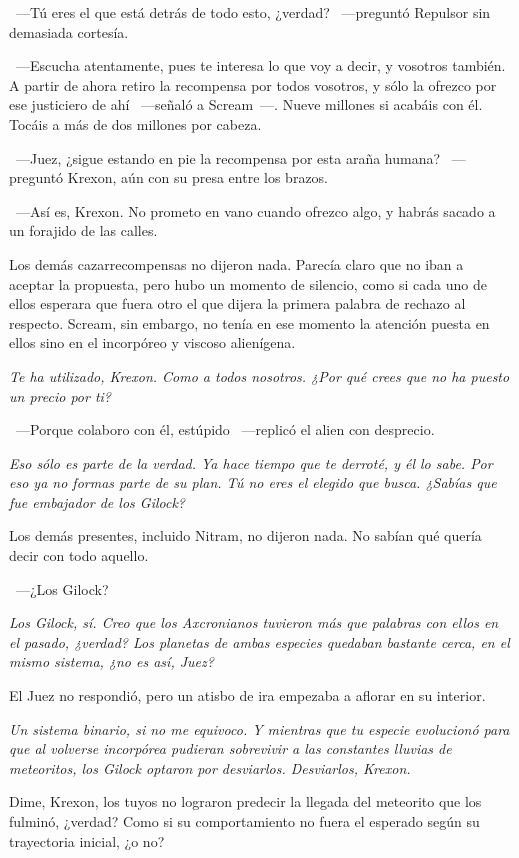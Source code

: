 ~---Tú eres el que está detrás de todo esto, ¿verdad? ~---preguntó Repulsor sin demasiada cortesía.

~---Escucha atentamente, pues te interesa lo que voy a decir, y vosotros también. A partir de ahora retiro la recompensa por todos vosotros, y sólo la ofrezco por ese justiciero de ahí ~---señaló a Scream~---. Nueve millones si acabáis con él. Tocáis a más de dos millones por cabeza.

~---Juez, ¿sigue estando en pie la recompensa por esta araña humana? ~---preguntó Krexon, aún con su presa entre los brazos.

~---Así es, Krexon. No prometo en vano cuando ofrezco algo, y habrás sacado a un forajido de las calles.

Los demás cazarrecompensas no dijeron nada. Parecía claro que no iban a aceptar la propuesta, pero hubo un momento de silencio, como si cada uno de ellos esperara que fuera otro el que dijera la primera palabra de rechazo al respecto. Scream, sin embargo, no tenía en ese momento la atención puesta en ellos sino en el incorpóreo y viscoso alienígena.

\emph{Te ha utilizado, Krexon. Como a todos nosotros. ¿Por qué crees que no ha puesto un precio por ti?}

~---Porque colaboro con él, estúpido ~---replicó el alien con desprecio.

\emph{Eso sólo es parte de la verdad. Ya hace tiempo que te derroté, y él lo sabe. Por eso ya no formas parte de su plan. Tú no eres el elegido que busca. ¿Sabías que fue embajador de los Gilock?}

Los demás presentes, incluido Nitram, no dijeron nada. No sabían qué quería decir con todo aquello.

~---¿Los Gilock?

\emph{Los Gilock, sí. Creo que los Axcronianos tuvieron más que palabras con ellos en el pasado, ¿verdad? Los planetas de ambas especies quedaban bastante cerca, en el mismo sistema, ¿no es así, Juez?}

El Juez no respondió, pero un atisbo de ira empezaba a aflorar en su interior.

\emph{Un sistema binario, si no me equivoco. Y mientras que tu especie evolucionó para que al volverse incorpórea pudieran sobrevivir a las constantes lluvias de meteoritos, los Gilock optaron por desviarlos. Desviarlos, Krexon.}

\rquoti Dime, Krexon, los tuyos no lograron predecir la llegada del meteorito que los fulminó, ¿verdad? Como si su comportamiento no fuera el esperado según su trayectoria inicial, ¿o no?

